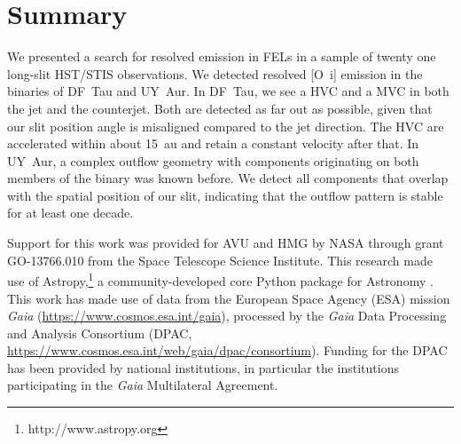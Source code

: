 \documentclass[twocolumn]{aastex62}
\begin{document}
\section{Summary}
\label{Sect:summary}
We presented a search for resolved emission in FELs in a sample of twenty one long-slit HST/STIS observations. We detected resolved [O~{\sc i}] emission in the binaries of DF~Tau and UY~Aur. In DF~Tau, we see a HVC and a MVC in both the jet and the counterjet. Both are detected as far out as possible, given that our slit position angle is misaligned compared to the jet direction. The HVC are accelerated within about 15~au and retain a constant velocity after that. In UY~Aur, a complex outflow geometry with components originating on both members of the binary was known before. We detect all components that overlap with the spatial position of our slit, indicating that the outflow pattern is stable for at least one decade.


\acknowledgments
Support for this work was provided for AVU and HMG by NASA through
grant GO-13766.010 from the Space Telescope Science Institute. This research made use of Astropy,\footnote{http://www.astropy.org} a community-developed core Python package for Astronomy \citep{2013A&A...558A..33A,2018AJ....156..123A}. 
This work has made use of data from the European Space Agency (ESA) mission
{\it Gaia} (\url{https://www.cosmos.esa.int/gaia}), processed by the {\it Gaia}
Data Processing and Analysis Consortium (DPAC,
\url{https://www.cosmos.esa.int/web/gaia/dpac/consortium}). Funding for the DPAC
has been provided by national institutions, in particular the institutions
participating in the {\it Gaia} Multilateral Agreement.





\end{document}
